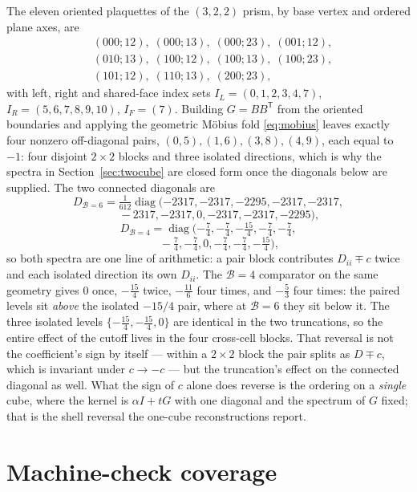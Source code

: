 \documentclass[11pt]{article}
\theoremstyle{plain}
\theoremstyle{definition}
\theoremstyle{remark}
\newcommand{\chk}[1]{}
\begin{document}
The eleven oriented plaquettes of the $(3,2,2)$ prism, by base vertex and
ordered plane axes, are
\[
\begin{aligned}
&(000;12),\;(000;13),\;(000;23),\;(001;12),\\
&(010;13),\;(100;12),\;(100;13),\;(100;23),\\
&(101;12),\;(110;13),\;(200;23),
\end{aligned}
\]
with left, right and shared-face index sets
$I_L=(0,1,2,3,4,7)$, $I_R=(5,6,7,8,9,10)$, $I_F=(7)$. Building $G=BB^{\mathsf
T}$ from the oriented boundaries and applying the geometric M\"obius fold
\eqref{eq:mobius} leaves exactly four nonzero off-diagonal pairs,
$(0,5),(1,6),(3,8),(4,9)$, each equal to $-1$: four disjoint $2\times2$ blocks
and three isolated directions, which is why the spectra in
Section~\ref{sec:twocube} are closed form once the diagonals below are
supplied. The two connected diagonals are
\[
  D_{\mathcal B=6}=\tfrac1{612}\operatorname{diag}
  (-2317,-2317,-2295,-2317,-2317,
\]
\[
  \qquad -2317,-2317,0,-2317,-2317,-2295),
\]
\[
  D_{\mathcal B=4}=\operatorname{diag}
  (-\tfrac74,-\tfrac74,-\tfrac{15}4,-\tfrac74,-\tfrac74,
\]
\[
  \qquad -\tfrac74,-\tfrac74,0,-\tfrac74,-\tfrac74,-\tfrac{15}4),
\]
so both spectra are one line of arithmetic: a pair block contributes
$D_{ii}\mp c$ twice and each isolated direction its own $D_{ii}$. The $\mathcal B=4$
comparator on the same geometry gives $0$ once, $-\tfrac{15}4$ twice,
$-\tfrac{11}6$ four times, and $-\tfrac53$ four times:
the paired levels sit \emph{above} the isolated $-15/4$ pair, where at $\mathcal B=6$
they sit below it. The three isolated levels $\{-\tfrac{15}4,-\tfrac{15}4,0\}$
are identical in the two truncations, so the entire effect of the cutoff lives
in the four cross-cell blocks. That reversal is not the coefficient's sign by itself --- within a
$2\times2$ block the pair splits as $D\mp c$, which is invariant under
$c\to-c$ --- but the truncation's effect on the connected diagonal as well.
What the sign of $c$ alone does reverse is the ordering on a \emph{single}
cube, where the kernel is $\alpha I+tG$ with one diagonal and the spectrum of
$G$ fixed; that is the shell reversal the one-cube reconstructions report.
\chk{the B=4 comparator on the same geometry gives -1/12 with the reversed spectrum}

\section{Machine-check coverage}\label{app:coverage}
\end{document}
